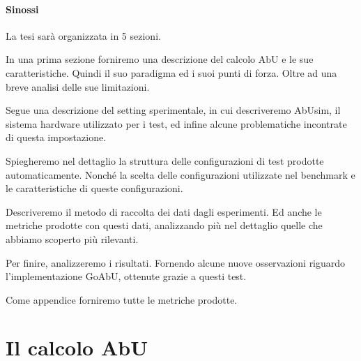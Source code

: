 \documentclass[12pt, a4paper]{article}
\begin{document}
\paragraph{Sinossi}

La tesi sarà organizzata in 5 sezioni.

In una prima sezione forniremo una descrizione del calcolo AbU e le sue caratteristiche. Quindi il suo paradigma ed i suoi punti di forza. Oltre ad una breve analisi delle sue limitazioni.

Segue una descrizione del setting sperimentale, in cui descriveremo AbUsim, il sistema hardware utilizzato per i test, ed infine alcune problematiche incontrate di questa impostazione.

Spiegheremo nel dettaglio la struttura delle configurazioni di test prodotte automaticamente. Nonché la scelta delle configurazioni utilizzate nel benchmark e le caratteristiche di queste configurazioni.

Descriveremo il metodo di raccolta dei dati dagli esperimenti. Ed anche le metriche prodotte con questi dati, analizzando più nel dettaglio quelle che abbiamo scoperto più rilevanti.

Per finire, analizzeremo i risultati. Fornendo alcune nuove osservazioni riguardo l'implementazione GoAbU, ottenute grazie a questi test.

Come appendice forniremo tutte le metriche prodotte.

\section{Il calcolo AbU}
\end{document}
